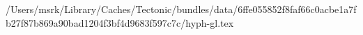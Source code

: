 /Users/msrk/Library/Caches/Tectonic/bundles/data/6ffe055852f8faf66c0acbe1a7fb27f87b869a90bad1204f3bf4d9683f597c7c/hyph-gl.tex